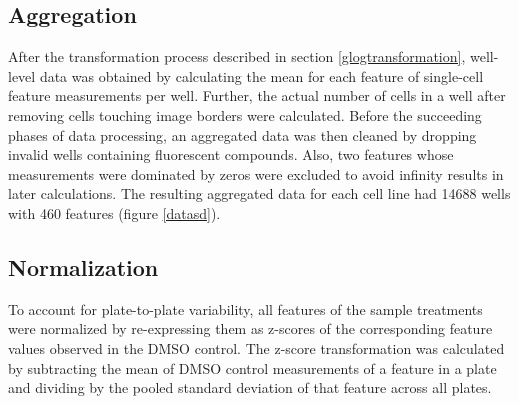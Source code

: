 \documentclass[11pt]{article}
\begin{document}
\subsection{Aggregation}\label{aggregation}
\par{After the transformation process described in section \ref{glogtransformation}, well-level data was obtained by calculating the mean for each feature of single-cell feature measurements per well. Further, the actual number of cells in a well after removing cells touching image borders were calculated. Before the succeeding phases of data processing, an aggregated data was then cleaned by dropping invalid wells containing fluorescent compounds. Also, two features whose measurements were dominated by zeros were excluded to avoid infinity results in later calculations. The resulting aggregated data for each cell line had 14688 wells with 460 features (figure \ref{datasd}). }

\subsection{Normalization} \label{normalization}
\par{To account for plate-to-plate variability, all features of the sample treatments were normalized by re-expressing them as z-scores of the corresponding feature values observed in the DMSO control. The z-score transformation was calculated by subtracting the mean of DMSO control measurements of a feature in a plate and dividing by the pooled standard deviation of that feature across all plates.}
  
\end{document}
